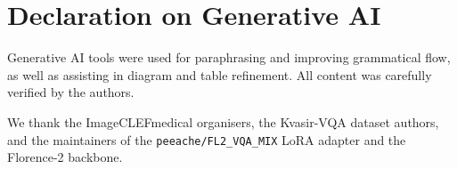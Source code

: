 \documentclass{ceurart}
\begin{document}
\section*{Declaration on Generative AI}

Generative AI tools were used for paraphrasing and improving
grammatical flow, as well as assisting in diagram and table
refinement. All content was carefully verified by the authors.

\begin{acknowledgments}
We thank the ImageCLEFmedical organisers, the Kvasir-VQA dataset
authors, and the maintainers of the \texttt{peeache/FL2\_VQA\_MIX}
LoRA adapter and the Florence-2 backbone.
\end{acknowledgments}
\end{document}
